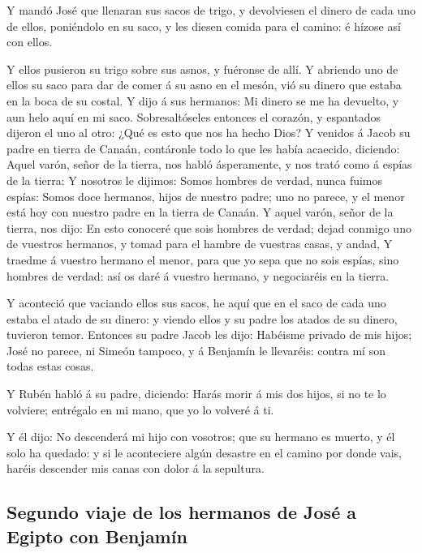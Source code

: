  Y mandó José que llenaran sus sacos de trigo, y
devolviesen el dinero de cada uno de ellos, poniéndolo en su saco, y les
diesen comida para el camino: é hízose así con ellos.

 Y ellos pusieron su trigo sobre sus asnos, y fuéronse de
allí.  Y abriendo uno de ellos su saco para dar de comer á
su asno en el mesón, vió su dinero que estaba en la boca de su costal.
 Y dijo á sus hermanos: Mi dinero se me ha devuelto, y aun
helo aquí en mi saco. Sobresaltóseles entonces el corazón, y espantados
dijeron el uno al otro: ¿Qué es esto que nos ha hecho Dios?
 Y venidos á Jacob su padre en tierra de Canaán, contáronle
todo lo que les había acaecido, diciendo:  Aquel varón,
señor de la tierra, nos habló ásperamente, y nos trató como á espías de
la tierra:  Y nosotros le dijimos: Somos hombres de verdad,
nunca fuimos espías:  Somos doce hermanos, hijos de nuestro
padre; uno no parece, y el menor está hoy con nuestro padre en la tierra
de Canaán.  Y aquel varón, señor de la tierra, nos dijo: En
esto conoceré que sois hombres de verdad; dejad conmigo uno de vuestros
hermanos, y tomad para el hambre de vuestras casas, y andad,
 Y traedme á vuestro hermano el menor, para que yo sepa que
no sois espías, sino hombres de verdad: así os daré á vuestro hermano, y
negociaréis en la tierra.

 Y aconteció que vaciando ellos sus sacos, he aquí que en
el saco de cada uno estaba el atado de su dinero: y viendo ellos y su
padre los atados de su dinero, tuvieron temor.  Entonces su
padre Jacob les dijo: Habéisme privado de mis hijos; José no parece, ni
Simeón tampoco, y á Benjamín le llevaréis: contra mí son todas estas
cosas.

 Y Rubén habló á su padre, diciendo: Harás morir á mis dos
hijos, si no te lo volviere; entrégalo en mi mano, que yo lo volveré á
ti.

 Y él dijo: No descenderá mi hijo con vosotros; que su
hermano es muerto, y él solo ha quedado: y si le aconteciere algún
desastre en el camino por donde vais, haréis descender mis canas con
dolor á la sepultura.

\hypertarget{segundo-viaje-de-los-hermanos-de-josuxe9-a-egipto-con-benjamuxedn}{%
\subsection{Segundo viaje de los hermanos de José a Egipto con
Benjamín}\label{segundo-viaje-de-los-hermanos-de-josuxe9-a-egipto-con-benjamuxedn}}

